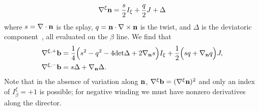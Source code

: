 {\begin{align}
    \nabla^\xi {\bf n}= \frac{s}{2}I_\xi + \frac{q}{2} J + \Delta
\end{align} 
where $s = \nabla \cdot \mathbf{n}$ is the splay, $q = \mathbf{n} \cdot \nabla \times \mathbf{n}$ is the twist, and $\Delta$ is the deviatoric component~\citep{Machon2016b,AlexanderBook,Selinger2019}, all evaluated on the $\beta$ line. We find that
\begin{align}
\nabla^{\xi,+} \mathbf{b} &=
\frac{1}{4}\Big(s^2 - q^2 - 4\mathrm{det}\Delta +2\nabla_{\mathbf{n}} s\Big)I_\xi+
\frac{1}{2} \Big(sq + \nabla_{\mathbf{n}} q \Big)J,  \\
\nabla^{\xi,-} \mathbf{b} &= s \Delta +\nabla_{\mathbf{n}} \Delta.
\end{align}
Note that in the absence of variation along $\mathbf{n}$, $\nabla^\xi \mathbf{b} = (\nabla^\xi{\bf n})^2$ and only an index of $I^\xi_\beta = +1$ is possible; for negative winding we must have nonzero derivatives along the director.

}
